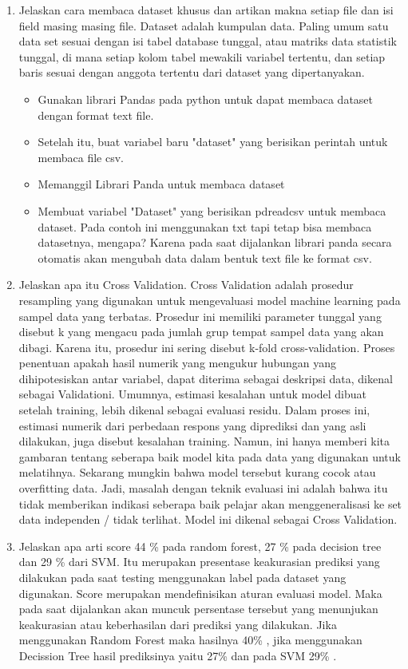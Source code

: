 \begin{enumerate}
\item Jelaskan cara membaca dataset khusus dan artikan makna setiap file dan isi field masing masing file.
Dataset adalah kumpulan data. Paling umum satu data set sesuai dengan isi tabel database tunggal, atau matriks data statistik tunggal, di mana setiap kolom tabel mewakili variabel tertentu, dan setiap baris sesuai dengan anggota tertentu dari dataset yang dipertanyakan.
\begin{itemize}
\item
Gunakan librari Pandas pada python untuk dapat membaca dataset dengan format text file.
\item
Setelah itu, buat variabel baru "dataset" yang berisikan perintah untuk membaca file csv.
\item
Memanggil Librari Panda untuk membaca dataset
\item
Membuat variabel "Dataset" yang berisikan pdreadcsv untuk membaca dataset. Pada contoh ini menggunakan txt tapi tetap bisa membaca datasetnya, mengapa? Karena pada saat dijalankan librari panda secara otomatis akan mengubah data dalam bentuk text file ke format csv.
\end{itemize}

\item Jelaskan apa itu Cross Validation.
Cross Validation adalah prosedur resampling yang digunakan untuk mengevaluasi model machine learning pada sampel data yang terbatas. Prosedur ini memiliki parameter tunggal yang disebut k yang mengacu pada jumlah grup tempat sampel data yang akan dibagi. Karena itu, prosedur ini sering disebut k-fold cross-validation.
Proses penentuan apakah hasil numerik yang mengukur hubungan yang dihipotesiskan antar variabel, dapat diterima sebagai deskripsi data, dikenal sebagai Validationi. Umumnya, estimasi kesalahan untuk model dibuat setelah training, lebih dikenal sebagai evaluasi residu. Dalam proses ini, estimasi numerik dari perbedaan respons yang diprediksi dan yang asli dilakukan, juga disebut kesalahan training. Namun, ini hanya memberi kita gambaran tentang seberapa baik model kita pada data yang digunakan untuk melatihnya. Sekarang mungkin bahwa model tersebut kurang cocok atau overfitting data. Jadi, masalah dengan teknik evaluasi ini adalah bahwa itu tidak memberikan indikasi seberapa baik pelajar akan menggeneralisasi ke set data independen / tidak terlihat. Model ini dikenal sebagai Cross Validation.

\item Jelaskan apa arti score 44 \% pada random forest, 27 \% pada decision tree dan 29 \% dari SVM.
Itu merupakan presentase keakurasian prediksi yang dilakukan pada saat testing menggunakan label pada dataset yang digunakan. Score merupakan mendefinisikan aturan evaluasi model. Maka pada saat dijalankan akan muncuk persentase tersebut yang menunjukan keakurasian atau keberhasilan dari prediksi yang dilakukan. Jika menggunakan Random Forest maka hasilnya 40\% , jika menggunakan Decission Tree hasil prediksinya yaitu 27\% dan pada SVM 29\% .


\end{enumerate}
